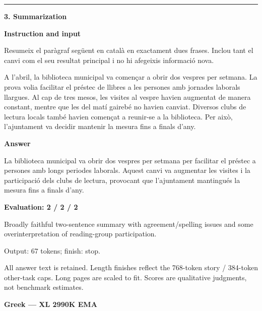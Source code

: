 \documentclass[10pt]{article}
\begin{document}
{\begin{minipage}{\textwidth}
\medskip\hrule\smallskip
{\bfseries 3. Summarization}\par\smallskip
\textbf{Instruction and input}\par Resumeix el paràgraf següent en català en exactament dues frases. Inclou tant el canvi com el seu resultat principal i no hi afegeixis informació nova.
\par\smallskip
A l'abril, la biblioteca municipal va començar a obrir dos vespres per setmana. La prova volia facilitar el préstec de llibres a les persones amb jornades laborals llargues. Al cap de tres mesos, les visites al vespre havien augmentat de manera constant, mentre que les del matí gairebé no havien canviat. Diversos clubs de lectura locals també havien començat a reunir-se a la biblioteca. Per això, l'ajuntament va decidir mantenir la mesura fins a finals d'any.\par\smallskip
\textbf{Answer}\par La biblioteca municipal va obrir dos vespres per setmana per facilitar el préstec a persones amb longs periodes laborals. Aquest canvi va augmentar les visites i la participació dels clubs de lectura, provocant que l'ajuntament mantingués la mesura fins a finals d'any.\par\smallskip
\textbf{Evaluation: 2 / 2 / 2}\par Broadly faithful two-sentence summary with agreement/spelling issues and some overinterpretation of reading-group participation.
\par {\color{gray} Output: 67 tokens; finish: stop.}\par
\medskip\footnotesize All answer text is retained. Length finishes reflect the 768-token story / 384-token other-task caps. Long pages are scaled to fit. Scores are qualitative judgments, not benchmark estimates.
\end{minipage}}%
\noindent\ifdim\dimexpr\ht\languagepage+\dp\languagepage\relax>0.93\textheight%
\resizebox*{!}{0.93\textheight}{\usebox{\languagepage}}%
\else\usebox{\languagepage}\fi%
\clearpage
{\Large\bfseries Greek --- XL 2990K EMA}\par\smallskip
\end{document}
